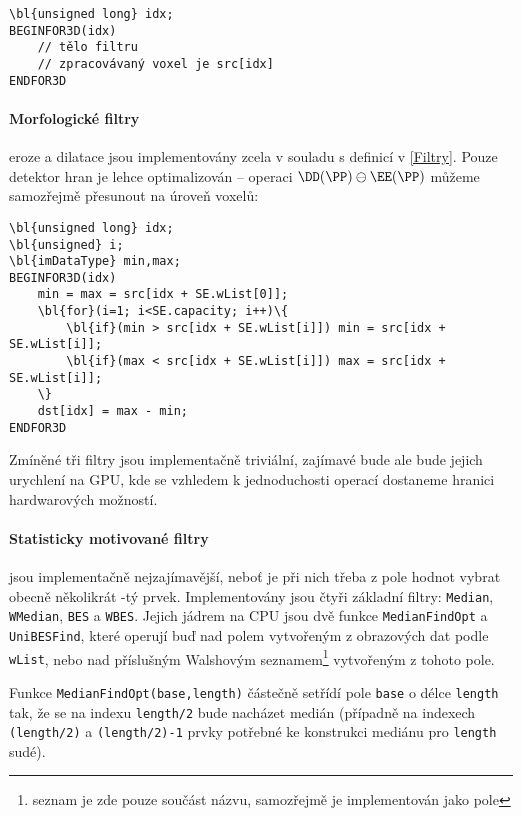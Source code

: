         \begin{Verbatim}[commandchars = \\\{\}]
\bl{unsigned long} idx;
BEGINFOR3D(idx)
    // tělo filtru
    // zpracovávaný voxel je src[idx]
ENDFOR3D
        \end{Verbatim}

        \paragraph{Morfologické filtry} eroze a dilatace jsou implementovány zcela v souladu s definicí v \ref{Filtry}. Pouze detektor hran je lehce optimalizován -- operaci $\DD(\PP) \ominus \EE(\PP)$ můžeme samozřejmě přesunout na úroveň voxelů:

        \begin{Verbatim}[commandchars = \\\{\}]
\bl{unsigned long} idx;
\bl{unsigned} i;
\bl{imDataType} min,max;
BEGINFOR3D(idx)
    min = max = src[idx + SE.wList[0]];
    \bl{for}(i=1; i<SE.capacity; i++)\{
        \bl{if}(min > src[idx + SE.wList[i]]) min = src[idx + SE.wList[i]];
        \bl{if}(max < src[idx + SE.wList[i]]) max = src[idx + SE.wList[i]];
    \}
    dst[idx] = max - min;
ENDFOR3D
        \end{Verbatim}

        Zmíněné tři filtry jsou implementačně triviální, zajímavé bude ale bude jejich urychlení na GPU, kde se vzhledem k jednoduchosti operací dostaneme hranici hardwarových možností.

        \paragraph{Statisticky motivované filtry} jsou implementačně nejzajímavější, neboť je při nich třeba z pole hodnot vybrat obecně několikrát \kk-tý prvek. Implementovány jsou čtyři základní filtry: {\tt Median}, {\tt WMedian}, {\tt BES} a {\tt WBES}. Jejich jádrem na CPU jsou dvě funkce {\tt MedianFindOpt} a {\tt UniBESFind}, které operují buď nad polem vytvořeným z obrazových dat podle {\tt wList}, nebo nad příslušným Walshovým seznamem\footnote{seznam je zde pouze součást názvu, samozřejmě je implementován jako pole} vytvořeným z tohoto pole.

        Funkce {\tt MedianFindOpt(base,length)} částečně setřídí pole {\tt base} o délce {\tt length} tak, že se na indexu {\tt length/2} bude nacházet medián (případně na indexech {\tt (length/2)} a {\tt (length/2)-1} prvky potřebné ke konstrukci mediánu pro {\tt length} sudé).
        

